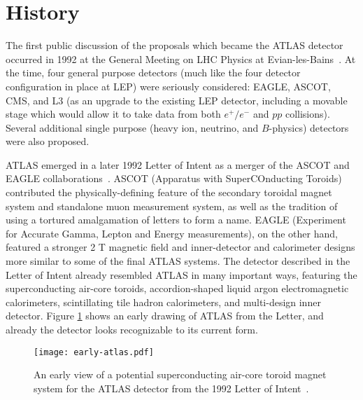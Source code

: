 
\section{History}

The first public discussion of the proposals which became the ATLAS detector occurred in 1992 at the General Meeting on LHC Physics at Evian-les-Bains~\cite{Evian,EvianCourier}. At the time, four general purpose detectors (much like the four detector configuration in place at LEP) were seriously considered: EAGLE, ASCOT, CMS, and L3 (as an upgrade to the existing LEP detector, including a movable stage which would allow it to take data from both $e^+/e^-$ and $pp$ collisions). Several additional single purpose (heavy ion, neutrino, and $B$-physics) detectors were also proposed.

ATLAS emerged in a later 1992 Letter of Intent as a merger of the ASCOT and EAGLE collaborations~\cite{ATLAS-LoI}. ASCOT (Apparatus with SuperCOnducting Toroids) contributed the physically-defining feature of the secondary toroidal magnet system and standalone muon measurement system, as well as the tradition of using a tortured amalgamation of letters to form a name. EAGLE (Experiment for Accurate Gamma, Lepton and Energy measurements), on the other hand, featured a stronger 2 T magnetic field and inner-detector and calorimeter designs more similar to some of the final ATLAS systems. The detector described in the Letter of Intent already resembled ATLAS in many important ways, featuring the superconducting air-core toroids, accordion-shaped liquid argon electromagnetic calorimeters, scintillating tile hadron calorimeters, and multi-design inner detector. Figure \ref{fig:detector:earlyatlas} shows an early drawing of ATLAS from the Letter, and already the detector looks recognizable to its current form.



\begin{figure}
\centering
\texttt{[image: early-atlas.pdf]}
\label{fig:detector:earlyatlas}
\caption{An early view of a potential superconducting air-core toroid magnet system for the ATLAS detector from the 1992 Letter of Intent~\cite{ATLAS-LoI}.}
\end{figure}


